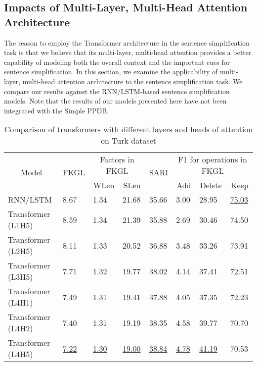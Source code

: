 \documentclass[11pt,a4paper]{article}
\begin{document}
\subsection{Impacts of Multi-Layer, Multi-Head Attention Architecture}
\label{sec:result-multilayermultihead}

The reason to employ the Transformer architecture in the sentence simplification task is that we believe that its multi-layer, multi-head attention provides a better capability of modeling both the overall context and the important cues for sentence simplification. In this section, we examine the applicability of multi-layer, multi-head attention architecture to the sentence simplification task. We compare our results against the RNN/LSTM-based sentence simplification models. Note that the results of our models presented here have not been integrated with the Simple PPDB.

\begin{table*}[!h]
\fontsize{8}{8}\selectfont
\centering
\renewcommand{\arraystretch}{1.3}
\begin{tabular}{|l|l|ll|l|lll|}
\hline
\multicolumn{1}{|c|}{\multirow{2}{*}{Model}} & \multicolumn{1}{c|}{\multirow{2}{*}{FKGL}} & \multicolumn{2}{c|}{Factors in FKGL} & \multicolumn{1}{c|}{\multirow{2}{*}{SARI}} & \multicolumn{3}{c|}{F1 for operations in FKGL} \\ \cline{3-4} \cline{6-8} 
\multicolumn{1}{|c|}{} & \multicolumn{1}{c|}{} & \multicolumn{1}{c|}{WLen} & \multicolumn{1}{c|}{SLen} & \multicolumn{1}{c|}{} & \multicolumn{1}{c|}{Add} & \multicolumn{1}{c|}{Delete} & \multicolumn{1}{c|}{Keep} \\ \hline
RNN/LSTM & 8.67 & 1.34 & 21.68 & 35.66 & 3.00 & 28.95 & \underline{75.03} \\
Transformer (L1H5) & 8.59 & 1.34 & 21.39 & 35.88 & 2.69 & 30.46 & 74.50 \\
Transformer (L2H5) & 8.11 & 1.33 & 20.52 & 36.88 & 3.48 & 33.26 & 73.91 \\
Transformer (L3H5) & 7.71 & 1.32 & 19.77 & 38.02 & 4.14 & 37.41 & 72.51 \\
Transformer (L4H1) & 7.49 & 1.31 & 19.41 & 37.88 & 4.05 & 37.35 & 72.23 \\
Transformer (L4H2) & 7.40 & 1.31 & 19.19 & 38.35 & 4.58 & 39.77 & 70.70 \\
Transformer (L4H5) & \underline{7.22} & \underline{1.30} & \underline{19.00} & \underline{38.84} & \underline{4.78} & \underline{41.19} & 70.53 \\ \hline
\end{tabular}
\caption{Comparison of transformers with different layers and heads of attention on Turk dataset}
\label{tab:trans_layer}
\end{table*}
\end{document}
